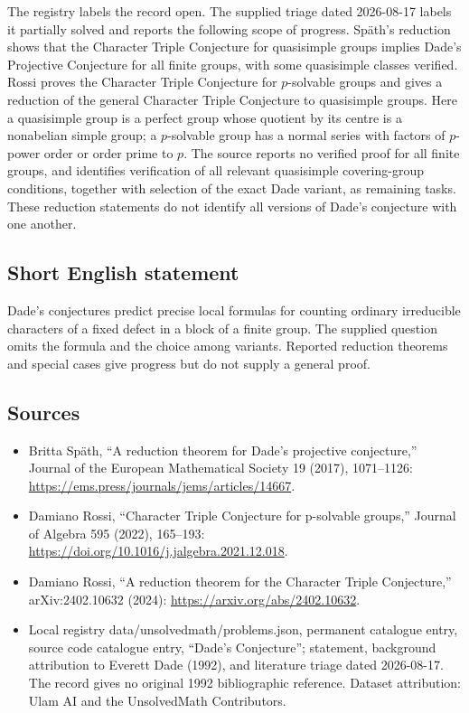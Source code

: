 \documentclass[11pt]{article}
\begin{document}
The registry labels the record open. The supplied triage dated 2026-08-17 labels it partially solved and reports the following scope of progress. Sp\"ath's reduction shows that the Character Triple Conjecture for quasisimple groups implies Dade's Projective Conjecture for all finite groups, with some quasisimple classes verified. Rossi proves the Character Triple Conjecture for $p$-solvable groups and gives a reduction of the general Character Triple Conjecture to quasisimple groups. Here a quasisimple group is a perfect group whose quotient by its centre is a nonabelian simple group; a $p$-solvable group has a normal series with factors of $p$-power order or order prime to $p$. The source reports no verified proof for all finite groups, and identifies verification of all relevant quasisimple covering-group conditions, together with selection of the exact Dade variant, as remaining tasks. These reduction statements do not identify all versions of Dade's conjecture with one another.
\subsection{Short English statement}
Dade's conjectures predict precise local formulas for counting ordinary irreducible characters of a fixed defect in a block of a finite group. The supplied question omits the formula and the choice among variants. Reported reduction theorems and special cases give progress but do not supply a general proof.
\subsection{Sources}
\begin{itemize}
\item Britta Sp\"ath, ``A reduction theorem for Dade's projective conjecture,'' Journal of the European Mathematical Society 19 (2017), 1071--1126: \url{https://ems.press/journals/jems/articles/14667}.
\item Damiano Rossi, ``Character Triple Conjecture for p-solvable groups,'' Journal of Algebra 595 (2022), 165--193: \url{https://doi.org/10.1016/j.jalgebra.2021.12.018}.
\item Damiano Rossi, ``A reduction theorem for the Character Triple Conjecture,'' arXiv:2402.10632 (2024): \url{https://arxiv.org/abs/2402.10632}.
\item Local registry data/unsolvedmath/problems.json, permanent catalogue entry, source code catalogue entry, ``Dade's Conjecture''; statement, background attribution to Everett Dade (1992), and literature triage dated 2026-08-17. The record gives no original 1992 bibliographic reference. Dataset attribution: Ulam AI and the UnsolvedMath Contributors.
\end{itemize}
\end{document}
